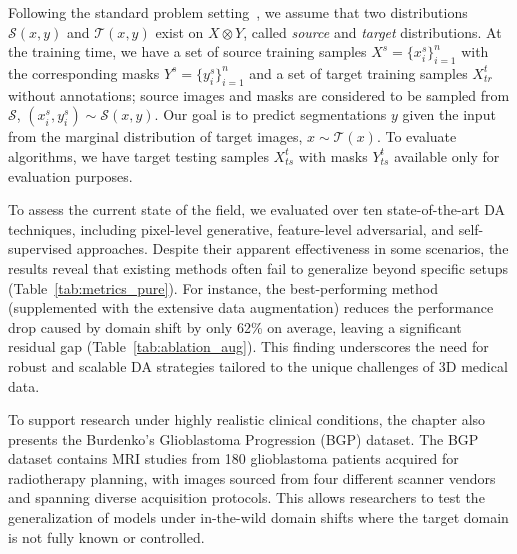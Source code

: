 Following the standard problem setting~\cite{dann}, we assume that two distributions $\mathcal{S}(x, y)$ and $\mathcal{T}(x, y)$ exist on $X \otimes Y$, called \textit{source} and \textit{target} distributions. At the training time, we have a set of source training samples $X^s = \{ x_i^s \}_{i=1}^n$ with the corresponding masks $Y^s = \{ y_i^s \}_{i=1}^n$ and a set of target training samples $X^t_{tr}$ without annotations; source images and masks are considered to be sampled from $\mathcal{S}$, $(x_i^s, y_i^s) \sim \mathcal{S}(x, y)$. Our goal is to predict segmentations $y$ given the input from the marginal distribution of target images, $x \sim \mathcal{T}(x)$. To evaluate algorithms, we have target testing samples $X^t_{ts}$ with masks $Y^t_{ts}$ available only for evaluation purposes.

To assess the current state of the field, we evaluated over ten state-of-the-art DA techniques, including pixel-level generative, feature-level adversarial, and self-supervised approaches. Despite their apparent effectiveness in some scenarios, the results reveal that existing methods often fail to generalize beyond specific setups (Table~\ref{tab:metrics_pure}). For instance, the best-performing method (supplemented with the extensive data augmentation) reduces the performance drop caused by domain shift by only 62\% on average, leaving a significant residual gap (Table~\ref{tab:ablation_aug}). This finding underscores the need for robust and scalable DA strategies tailored to the unique challenges of 3D medical data.






To support research under highly realistic clinical conditions, the chapter also presents the Burdenko’s Glioblastoma Progression (BGP) dataset. The BGP dataset contains MRI studies from 180 glioblastoma patients acquired for radiotherapy planning, with images sourced from four different scanner vendors and spanning diverse acquisition protocols. This allows researchers to test the generalization of models under in-the-wild domain shifts where the target domain is not fully known or controlled.

